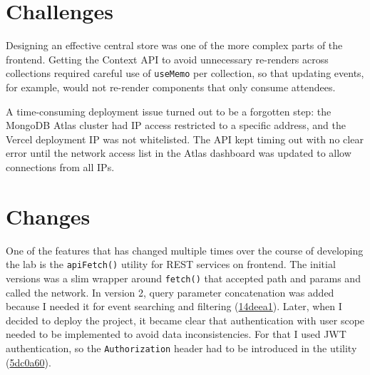 \documentclass[12pt, a4paper]{article}
\begin{document}
\section{Challenges}

Designing an effective central store was one of the more complex parts of the
frontend. Getting the Context API to avoid unnecessary re-renders across
collections required careful use of \texttt{useMemo} per collection, so that
updating events, for example, would not re-render components that only consume
attendees.

A time-consuming deployment issue turned out to be a forgotten step: the
MongoDB Atlas cluster had IP access restricted to a specific address, and the
Vercel deployment IP was not whitelisted. The API kept timing out with no
clear error until the network access list in the Atlas dashboard was updated
to allow connections from all IPs.

\section{Changes}

One of the features that has changed multiple times over the course of 
developing the lab is the \texttt{apiFetch()} utility for REST services on 
frontend. The initial versions was a slim wrapper around \texttt{fetch()} 
that accepted path and params and called the network. In version 2, query 
parameter concatenation was added because I needed it for event searching 
and filtering (\href{https://github.com/ramz1t/hkr-fullstack-lab/commit/14deea1964b07d65fcfe9b46de8608b03753afe5}{14deea1}). 
Later, when I decided to deploy the project, it became clear that 
authentication with user scope needed to be implemented to avoid data 
inconsistencies. For that I used JWT authentication, so the \texttt{Authorization} 
header had to be introduced in the utility 
(\href{https://github.com/ramz1t/hkr-fullstack-lab/commit/5dc0a605117a689ca0ac7a00e3c0045e82617651}{5dc0a60}).
\end{document}
